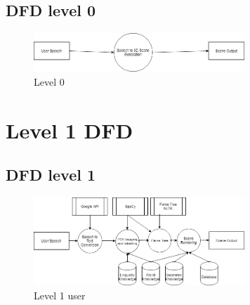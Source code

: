 \documentclass[12pt,a4paper,final,oneside]{report}
\begin{document}
\subsection{DFD level 0}
\begin{figure}[h]
\begin{center}
\includegraphics[width=300px]{dfd0.png} \caption{Level 0}
\end{center}
\end{figure}


\section{  Level 1 DFD}
\subsection{DFD level 1}
\begin{figure}[h]
\begin{center}
\includegraphics[width=300px]{dfd1.png} \caption{Level 1 user}
\end{center}
\end{figure}
\end{document}
